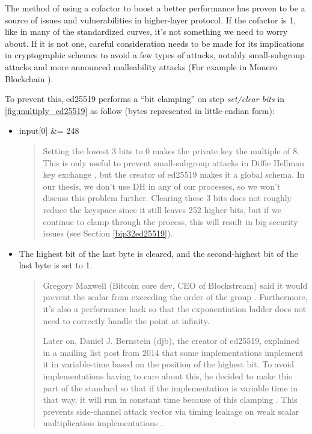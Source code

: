 \begin{adjustwidth}{1cm}{}
    The method of using a cofactor to boost a better performance \cite{DBLP:journals/iacr/BernsteinL17} has proven to be a source of issues and vulnerabilities in higher-layer protocol. If the cofactor is 1, like in many of the standardized curves, it’s not something we need to worry about. If it is not one, careful consideration needs to be made for its implications in cryptographic schemes to avoid a few types of attacks, notably small-subgroup attacks \cite{DBLP:journals/rfc/rfc2785} and more announced malleability attacks (For example in Monero Blockchain \cite{Riccardo}).

    To prevent this, ed25519 performs a “bit clamping” on step \textit{set/clear bits} in \autoref{fig:multiply_ed25519} as follow (bytes represented in little-endian form):

    \begin{itemize}
        \item input[0] \&= 248
              \begin{quote}
                  Setting the lowest 3 bits to 0 makes the private key the multiple of 8. This is only useful to prevent small-subgroup attacks in Diffie Hellman key exchange \cite{enwiki:1057850165}, but the creator of ed25519 makes it a global schema. In our thesis, we don't use DH in any of our processes, so we won't discuss this problem further. Clearing these 3 bits does not roughly reduce the keyspace since it still leaves 252 higher bits, but if we continue to clamp through the process, this will result in big security issues (see Section \ref{bip32ed25519}).

              \end{quote}

              \bigskip

        \item The highest bit of the last byte is cleared, and the second-highest bit of the last byte is set to 1.
              \begin{quote}

                  Gregory Maxwell (Bitcoin core dev, CEO of Blockstream) said it would prevent the scalar from exceeding the order of the group \cite{mail:000860}. Furthermore, it's also a performance hack so that the exponentiation ladder does not need to correctly handle the point at infinity.

                  Later on, Daniel J. Bernstein (djb), the creator of ed25519, explained in a mailing list post from 2014 that some implementations implement it in variable-time based on the position of the highest bit. To avoid implementations having to care about this, he decided to make this part of the standard so that if the implementation is variable time in that way, it will run in constant time because of this clamping \cite{Bernstein:2014}. This prevents side-channel attack vector via timing leakage on weak scalar multiplication implementations \cite{DBLP:journals/iacr/BrumleyT11}.


\end{quote}
\end{itemize}
\end{adjustwidth}

